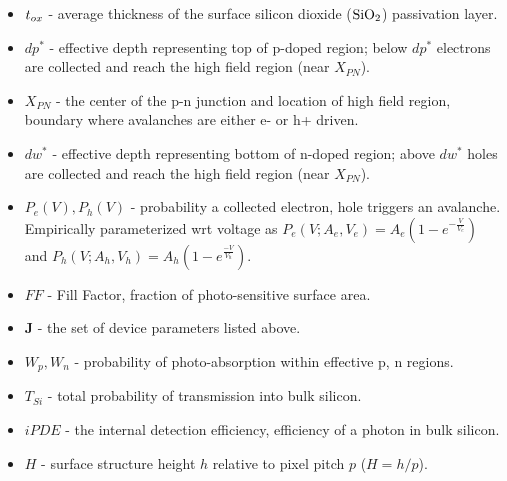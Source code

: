 \begin{itemize}[nosep]
    \item $t_{ox}$ - average thickness of the surface silicon dioxide ($\ce{SiO2}$) passivation layer.
    \item $dp^*$ - effective depth representing top of p-doped region; below $dp^*$ electrons are collected and reach the high field region (near $X_{PN}$).
    \item $X_{PN}$ - the center of the p-n junction and location of high field region, boundary where avalanches are either e- or h+ driven.
    \item $dw^*$ - effective depth representing bottom of n-doped region; above $dw^*$ holes are collected and reach the high field region (near $X_{PN}$).
    \item $P_e(V), P_h(V)$ - probability a collected electron, hole triggers an avalanche. Empirically parameterized wrt voltage as $P_e(V;A_e, V_e) = A_e(1-e^{-\frac{V}{V_e}})$ and $P_h(V;A_h, V_h)=A_h(1-e^\frac{-V}{V_h})$.
    \item $FF$ - Fill Factor, fraction of photo-sensitive surface area.
    \item $\mathbf{J}$ - the set of device parameters listed above.
    \item $W_p, W_n$ - probability of photo-absorption within effective p, n regions.
    \item $T_{Si}$ - total probability of transmission into bulk silicon.
    \item $iPDE$ - the internal detection efficiency, efficiency of a photon in bulk silicon.
    \item $H$ - surface structure height $h$ relative to pixel pitch $p$ ($H = h/p$).
\end{itemize}

